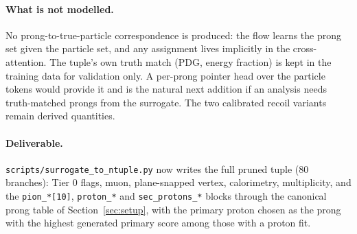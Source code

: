 \paragraph{What is not modelled.} No prong-to-true-particle correspondence is produced: the flow learns the
prong set given the particle set, and any assignment lives implicitly in the cross-attention. The tuple's
own truth match (PDG, energy fraction) is kept in the training data for validation only. A per-prong pointer
head over the particle tokens would provide it and is the natural next addition if an analysis needs
truth-matched prongs from the surrogate. The two calibrated recoil variants remain derived quantities.

\paragraph{Deliverable.} \texttt{scripts/surrogate\_to\_ntuple.py} now writes the full pruned tuple (80 branches):
Tier 0 flags, muon, plane-snapped vertex, calorimetry, multiplicity, and the \texttt{pion\_*[10]},
\texttt{proton\_*} and \texttt{sec\_protons\_*} blocks through the canonical prong table of Section~\ref{sec:setup},
with the primary proton chosen as the prong with the highest generated primary score among those with a proton
fit.
